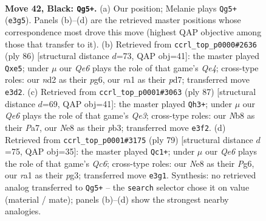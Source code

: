 \documentclass[11pt]{article}
\begin{document}
\clearpage

\begin{figure}[p]\centering
\begin{subfigure}{0.46\textwidth}\centering
\resizebox{\linewidth}{!}{%
\newchessgame
\chessboard[
  setfen={1n2nk2/7Q/7p/p4p1P/P6K/4q3/2rN4/RN6 b - - 8 42},
  showmover=false,
  pgfstyle=straightmove, color=movearrow, markmove={e3-g5}
]}
\caption{}
\end{subfigure}\hfill
\begin{subfigure}{0.46\textwidth}\centering
\resizebox{\linewidth}{!}{%
\newchessgame
\chessboard[
  setfen={3r4/p2p1k2/5Pp1/1P1Nn1R1/4Q3/7q/7P/7K w - - 1 44},
  showmover=false,
  pgfstyle=straightmove, color=movearrow, markmove={e4-e5}
]}
\caption{}
\end{subfigure}
\\[4pt]
\begin{subfigure}{0.46\textwidth}\centering
\resizebox{\linewidth}{!}{%
\newchessgame
\chessboard[
  setfen={3r3k/p7/4q2p/3Nn3/4Q3/1P4P1/P2R4/5K2 b - - 1 44},
  showmover=false,
  pgfstyle=straightmove, color=movearrow, markmove={e6-h3}
]}
\caption{}
\end{subfigure}\hfill
\begin{subfigure}{0.46\textwidth}\centering
\resizebox{\linewidth}{!}{%
\newchessgame
\chessboard[
  setfen={6k1/5p2/p5p1/P2Q4/6N1/2q1P1PP/3n4/6K1 b - - 0 40},
  showmover=false,
  pgfstyle=straightmove, color=movearrow, markmove={c3-c1}
]}
\caption{}
\end{subfigure}
\caption{\textbf{Move 42, Black: \texttt{Qg5+}.} (a) Our position; Melanie plays \texttt{Qg5+} (\texttt{e3g5}). Panels (b)--(d) are the retrieved master positions whose correspondence most drove this move (highest QAP objective among those that transfer to it). (b) Retrieved from \texttt{ccrl\_top\_p0000\#2636} (ply 86) [structural distance $d$=73, QAP obj=41]: the master played \texttt{Qxe5}; under $\mu$ our \emph{Qe6} plays the role of that game's \emph{Qe4}; cross-type roles: our \emph{n}d2 as their \emph{p}g6, our \emph{r}a1 as their \emph{p}d7; transferred move \texttt{e3d2}. (c) Retrieved from \texttt{ccrl\_top\_p0001\#3063} (ply 87) [structural distance $d$=69, QAP obj=41]: the master played \texttt{Qh3+}; under $\mu$ our \emph{Qe6} plays the role of that game's \emph{Qe3}; cross-type roles: our \emph{N}b8 as their \emph{P}a7, our \emph{N}e8 as their \emph{p}b3; transferred move \texttt{e3f2}. (d) Retrieved from \texttt{ccrl\_top\_p0001\#3175} (ply 79) [structural distance $d$=75, QAP obj=35]: the master played \texttt{Qc1+}; under $\mu$ our \emph{Qe6} plays the role of that game's \emph{Qc6}; cross-type roles: our \emph{N}e8 as their \emph{P}g6, our \emph{r}a1 as their \emph{p}g3; transferred move \texttt{e3g1}. Synthesis: no retrieved analog transferred to \texttt{Qg5+} -- the \texttt{search} selector chose it on value (material / mate); panels (b)--(d) show the strongest nearby analogies.}
\label{fig:thought-m83}
\end{figure}
\end{document}
